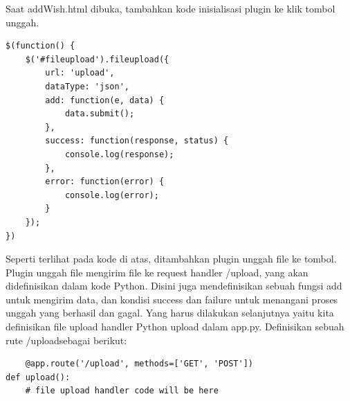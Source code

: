 Saat addWish.html dibuka, tambahkan kode inisialisasi plugin ke klik tombol unggah.

\begin{verbatim}
$(function() {
    $('#fileupload').fileupload({
        url: 'upload',
        dataType: 'json',
        add: function(e, data) {
            data.submit();
        },
        success: function(response, status) {
            console.log(response);
        },
        error: function(error) {
            console.log(error);
        }
    });
})
\end{verbatim}
Seperti terlihat pada kode di atas, ditambahkan plugin unggah file ke tombol. Plugin unggah file mengirim file ke request handler /upload, yang akan didefinisikan dalam kode Python. Disini juga mendefinisikan sebuah fungsi add untuk mengirim data, dan kondisi success dan failure untuk menangani proses unggah yang berhasil dan gagal.
Yang harus dilakukan selanjutnya yaitu kita definisikan file upload handler Python upload dalam app.py. Definisikan sebuah rute /uploadsebagai berikut:
\begin{verbatim}
	@app.route('/upload', methods=['GET', 'POST'])
def upload():
    # file upload handler code will be here
    
\end{verbatim}
    
